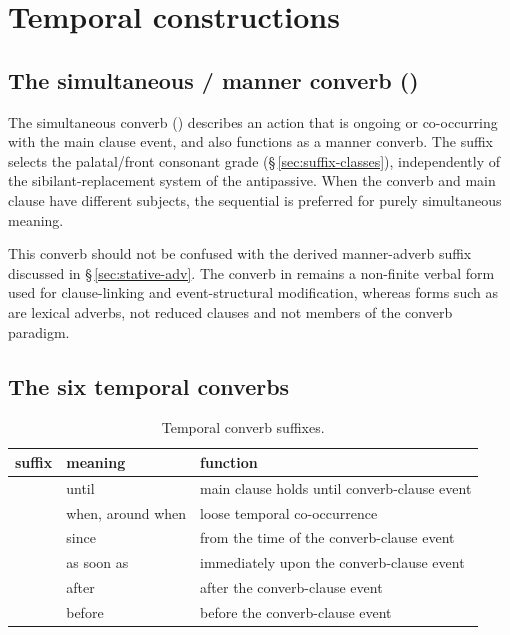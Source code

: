 \section{Temporal constructions}\label{sec:temporal}

\subsection{The simultaneous / manner converb ()}

The simultaneous converb () describes an action that is ongoing or
co-occurring with the main clause event, and also functions as a manner converb.
The suffix selects the palatal/front consonant grade
(§\,\ref{sec:suffix-classes}), independently of the sibilant-replacement
system of the antipassive. When the converb and main clause have different
subjects, the sequential  is preferred for purely simultaneous
meaning.

This converb should not be confused with the derived manner-adverb suffix
 discussed in §\,\ref{sec:stative-adv}. The converb in 
remains a non-finite verbal form used for clause-linking and event-structural
modification, whereas forms such as   are lexical
adverbs, not reduced clauses and not members of the converb paradigm.

\subsection{The six temporal converbs}

\begin{table}[ht]
	\footnotesize
	\caption{Temporal converb suffixes.}\label{tab:tempconverbs}
	\begin{tabularx}{0.9\textwidth}{L l L}
		\toprule
		{\sc suffix} & {\sc meaning} & {\sc function} \\
		\midrule
		    & until              & main clause holds until converb-clause event \\
		  & when, around when  & loose temporal co-occurrence \\
		    & since              & from the time of the converb-clause event \\
		 & as soon as         & immediately upon the converb-clause event \\
		  & after              & after the converb-clause event \\
		    & before             & before the converb-clause event \\
		\bottomrule
	\end{tabularx}
\end{table}

